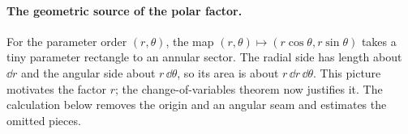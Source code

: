 \paragraph{The geometric source of the polar factor.}
For the parameter order $(r,\theta)$, the map
$(r,\theta)\mapsto(r\cos\theta,r\sin\theta)$ takes a tiny parameter
rectangle to an annular sector. The radial side has length about $\dd r$
and the angular side about $r\,\dd\theta$, so its area is about
$r\,\dd r\,\dd\theta$. This picture motivates the factor $r$; the
change-of-variables theorem now justifies it. The calculation below removes
the origin and an angular seam and estimates the omitted pieces.
\begin{center}
\end{center}

